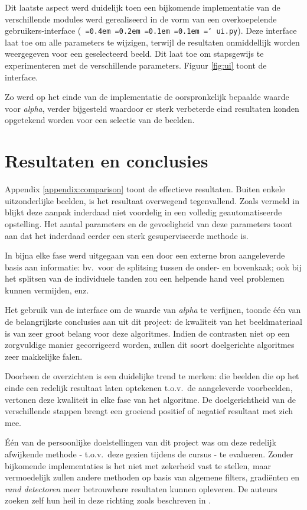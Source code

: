 \documentclass[10pt,a4paper]{article}
\newcommand*\justify{%
  \fontdimen2\font=0.4em%
  \fontdimen3\font=0.2em%
  \fontdimen4\font=0.1em%
  \fontdimen7\font=0.1em%
  \hyphenchar\font=`\-%
}
\newcommand{\ttt}[1]{{\tt \justify{#1}}}
\begin{document}
Dit laatste aspect werd duidelijk toen een bijkomende implementatie van de verschillende modules werd gerealiseerd in de vorm van een overkoepelende gebruikers-interface (\ttt{ui.py}). Deze interface laat toe om alle parameters te wijzigen, terwijl de resultaten onmiddellijk worden weergegeven voor een geselecteerd beeld. Dit laat toe om stapsgewijs te experimenteren met de verschillende parameters. Figuur \ref{fig:ui} toont de interface.

Zo werd op het einde van de implementatie de oorspronkelijk bepaalde waarde voor \emph{alpha}, verder bijgesteld waardoor er sterk verbeterde eind resultaten konden opgetekend worden voor een selectie van de beelden.

\section*{Resultaten en conclusies}

Appendix \ref{appendix:comparison} toont de effectieve resultaten. Buiten enkele uitzonderlijke beelden, is het resultaat overwegend tegenvallend. Zoals vermeld in \cite{jain2004matching} blijkt deze aanpak inderdaad niet voordelig in een volledig geautomatiseerde opstelling. Het aantal parameters en de gevoeligheid van deze parameters toont aan dat het inderdaad eerder een sterk gesuperviseerde methode is.

In bijna elke fase werd uitgegaan van een door een externe bron aangeleverde basis aan informatie: bv.\ voor de splitsing tussen de onder- en bovenkaak; ook bij het splitsen van de individuele tanden zou een helpende hand veel problemen kunnen vermijden, enz.

Het gebruik van de interface om de waarde van \emph{alpha} te verfijnen, toonde \'e\'en van de belangrijkste conclusies aan uit dit project: de kwaliteit van het beeldmateriaal is van zeer groot belang voor deze algoritmes. Indien de contrasten niet op een zorgvuldige manier gecorrigeerd worden, zullen dit soort doelgerichte algoritmes zeer makkelijke falen.

Doorheen de overzichten is een duidelijke trend te merken: die beelden die op het einde een redelijk resultaat laten optekenen t.o.v.\ de aangeleverde voorbeelden, vertonen deze kwaliteit in elke fase van het algoritme. De doelgerichtheid van de verschillende stappen brengt een groeiend positief of negatief resultaat met zich mee.

\'E\'en van de persoonlijke doelstellingen van dit project was om deze redelijk afwijkende methode - t.o.v.\ deze gezien tijdens de cursus - te evalueren. Zonder bijkomende implementaties is het niet met zekerheid vast te stellen, maar vermoedelijk zullen andere methoden op basis van algemene filters, gradi\"enten en \emph{rand detectoren} meer betrouwbare resultaten kunnen opleveren. De auteurs zoeken zelf hun heil in deze richting zoals beschreven in \cite{chen2004tooth}.
\end{document}
